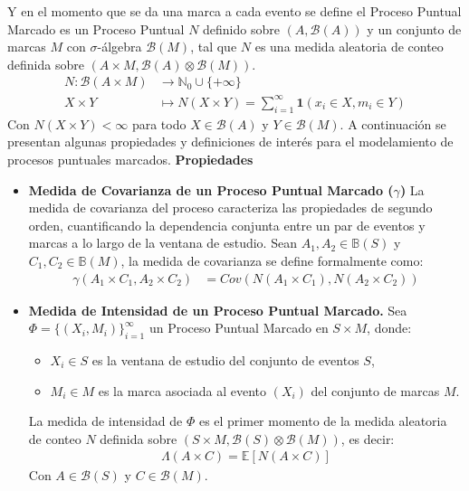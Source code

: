\begin{enumerate}
    Y en el momento que se da una marca a cada evento se define el Proceso Puntual Marcado es un Proceso Puntual $N$ definido sobre $(A, \mathcal{B}(A))$
    y un conjunto de marcas $M$ con $\sigma$-álgebra $\mathcal{B}(M)$, tal que $N$ es una medida aleatoria de conteo definida
    sobre $(A \times M, \mathcal{B}(A) \otimes \mathcal{B}(M))$.
    \begin{align*}
        N: \mathcal{B}(A \times M) &\longrightarrow \mathbb{N}_0 \cup \{+\infty\} \\
        X \times Y &\longmapsto N(X \times Y) = \sum_{i=1}^{\infty} \mathbf{1}(x_i\in X, m_i \in Y)
    \end{align*}
    Con $N(X\times Y) < \infty$ para todo $X \in \mathcal{B}(A)$ y $Y \in \mathcal{B}(M)$.\cite{daley2003introduction}
    A continuación se presentan algunas propiedades y definiciones de interés para el modelamiento de procesos puntuales marcados.
    \textbf{Propiedades}
    \begin{itemize}
        \item \textbf{Medida de Covarianza de un Proceso Puntual Marcado ($\gamma$)}
        La medida de covarianza del proceso caracteriza las propiedades de segundo orden, cuantificando la dependencia conjunta entre un par de eventos
        y marcas a lo largo de la ventana de estudio. Sean $A_1, A_2 \in \mathbb{B}(S)$ y $C_1, C_2 \in \mathbb{B}(M)$, la medida de covarianza se define formalmente como: 
        \cite{daley2003introduction}
        \begin{align*}
            \gamma(A_1\times C_1, A_2\times C_2) &= Cov(N(A_1\times C_1), N(A_2\times C_2))
        \end{align*}
        \item \textbf{Medida de Intensidad de un Proceso Puntual Marcado.}
        Sea $\Phi=\{(X_i, M_i)\}_{i=1}^{\infty}$ un Proceso Puntual Marcado en $S\times M$, donde:
        \begin{itemize}
            \item $X_i \in S$ es la ventana de estudio del conjunto de eventos $S$,
            \item $M_i \in M$ es la marca asociada al evento $(X_i)$ del conjunto de marcas $M$.
        \end{itemize}
        La medida de intensidad de $\Phi$ es el primer momento de la medida aleatoria de conteo $N$ definida sobre
        $(S \times M, \mathcal{B}(S) \otimes \mathcal{B}(M))$, es decir:
        \begin{align*}
            \Lambda(A \times C)= \mathbb{E}[N(A\times C)]
        \end{align*}
        Con $A \in \mathcal{B}(S)$ y $C \in \mathcal{B}(M)$.
        \cite{daley2003introduction}


\end{itemize}
\end{enumerate}
